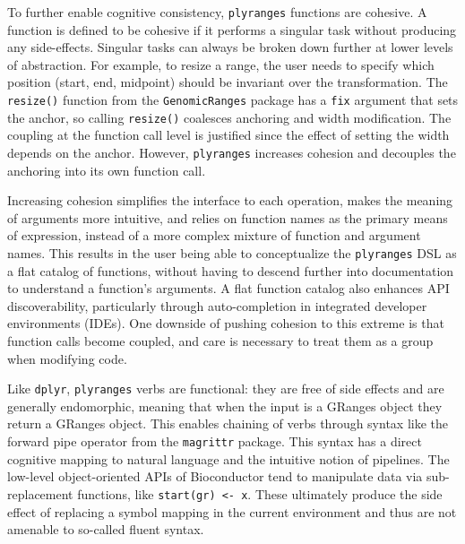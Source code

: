 \documentclass[]{article}
\begin{document}
To further enable cognitive consistency, \texttt{plyranges} functions
are cohesive. A function is defined to be cohesive if it performs a
singular task without producing any side-effects. Singular tasks can
always be broken down further at lower levels of abstraction. For
example, to resize a range, the user needs to specify which position
(start, end, midpoint) should be invariant over the transformation. The
\texttt{resize()} function from the \texttt{GenomicRanges} package has a
\texttt{fix} argument that sets the anchor, so calling \texttt{resize()}
coalesces anchoring and width modification. The coupling at the function
call level is justified since the effect of setting the width depends on
the anchor. However, \texttt{plyranges} increases cohesion and decouples
the anchoring into its own function call.

Increasing cohesion simplifies the interface to each operation, makes
the meaning of arguments more intuitive, and relies on function names as
the primary means of expression, instead of a more complex mixture of
function and argument names. This results in the user being able to
conceptualize the \texttt{plyranges} DSL as a flat catalog of functions,
without having to descend further into documentation to understand a
function's arguments. A flat function catalog also enhances API
discoverability, particularly through auto-completion in integrated
developer environments (IDEs). One downside of pushing cohesion to this
extreme is that function calls become coupled, and care is necessary to
treat them as a group when modifying code.

Like \texttt{dplyr}, \texttt{plyranges} verbs are functional: they are
free of side effects and are generally endomorphic, meaning that when
the input is a GRanges object they return a GRanges object. This enables
chaining of verbs through syntax like the forward pipe operator from the
\texttt{magrittr} package. This syntax has a direct cognitive mapping to
natural language and the intuitive notion of pipelines. The low-level
object-oriented APIs of Bioconductor tend to manipulate data via
sub-replacement functions, like \texttt{start(gr)\ \textless{}-\ x}.
These ultimately produce the side effect of replacing a symbol mapping
in the current environment and thus are not amenable to so-called fluent
syntax.
\end{document}
